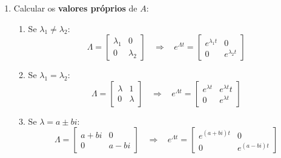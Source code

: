 \documentclass[11pt, a4paper]{article}
\begin{document}
\begin{itemize}
    \begin{enumerate}
        \item Calcular os \textbf{valores próprios} de $A$:
        \begin{enumerate}
            \item Se $\lambda_1 \ne \lambda_2$:
            \begin{equation*}
                \Lambda = \left[\begin{matrix}
                    \lambda_1 & 0 \\
                    0 & \lambda_2
                \end{matrix}\right] \ \ \ \ \Rightarrow \ \ \ \ 
                e^{\Lambda t} = \left[\begin{matrix}
                    e^{\lambda_1 t} & 0 \\
                    0 & e^{\lambda_2 t}
                \end{matrix}\right]
            \end{equation*}
            \item Se $\lambda_1 = \lambda_2$:
            \begin{equation*}
                \Lambda = \left[\begin{matrix}
                    \lambda & 1 \\
                    0 & \lambda
                \end{matrix}\right] \ \ \ \ \Rightarrow \ \ \ \ 
                e^{\Lambda t} = \left[\begin{matrix}
                    e^{\lambda t} & e^{\lambda t}t \\
                    0 & e^{\lambda t}
                \end{matrix}\right]
            \end{equation*}
            \item Se $\lambda = a \pm bi$:
            \begin{equation*}
                \Lambda = \left[\begin{matrix}
                    a+bi & 0 \\
                    0 & a-bi
                \end{matrix}\right] \ \ \ \ \Rightarrow \ \ \ \ 
                e^{\Lambda t} = \left[\begin{matrix}
                    e^{(a+bi) t} & 0 \\
                    0 & e^{(a-bi) t}
                \end{matrix}\right]

\end{equation*}
\end{enumerate}
\end{enumerate}
\end{itemize}
\end{document}
